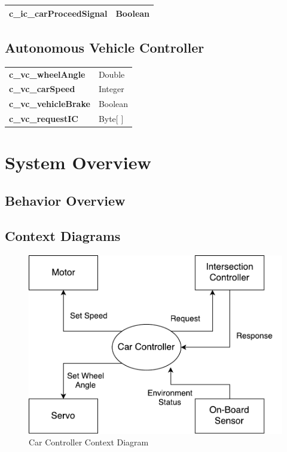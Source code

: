 \documentclass [10pt]{article}
\begin{document}
\begin{longtable}{ |p{ }  p{ }|}  \hline

\textbf{c\_ic\_carProceedSignal} & Boolean \\ \hline
\end{longtable}

\subsection{Autonomous Vehicle Controller}

\begin{longtable}{ |p{ }  p{ }|}  \hline
\textbf{c\_vc\_wheelAngle} & Double  \\

\cellcolor{tableCell}\textbf{c\_vc\_carSpeed}  & \cellcolor{tableCell}Integer \\ 

\textbf{c\_vc\_vehicleBrake} & Boolean \\ 

\cellcolor{tableCell}\textbf{c\_vc\_requestIC}  & \cellcolor{tableCell}Byte[ ]\\ \hline
\end{longtable}



\section{System Overview}


\subsection{Behavior Overview}
     

\subsection{Context Diagrams}

\begin{figure} [h!]
	\caption{Car Controller Context Diagram} \bigskip
	\centering
	\includegraphics [scale =0.8] {figures/CarCtrl_ContextDiag.pdf}

\end{figure}
\end{document}

